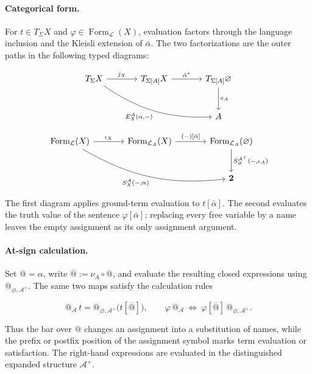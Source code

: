 \documentclass[11pt]{article}
\makeatletter
\newcommand{\atsign}{\mathord{@}}
\theoremstyle{definition}
\makeatother
\begin{document}
\paragraph{Categorical form.}
For \(t\in T_\Sigma X\) and
\(\varphi\in\operatorname{Form}_{\mathcal L}(X)\), evaluation factors through
the language inclusion and the Kleisli extension of \(\bar\alpha\). The two
factorizations are the outer paths in the following typed diagrams:

\[
\begin{tikzcd}[row sep=large,column sep=large]
T_\Sigma X
  \arrow[r,"j_X"]
  \arrow[drr,bend right=18,"{E_X^{\mathcal A}(\alpha,-)}"'] &
T_{\Sigma[A]}X \arrow[r,"\bar\alpha^*"] &
T_{\Sigma[A]}\varnothing \arrow[d,"e_A"] \\
&& A
\end{tikzcd}
\]

\[
\begin{tikzcd}[row sep=large,column sep=large]
\operatorname{Form}_{\mathcal L}(X)
  \arrow[r,"\iota_X"]
  \arrow[drr,bend right=18,"{S_X^{\mathcal A}(-,\alpha)}"'] &
\operatorname{Form}_{\mathcal L_A}(X)
  \arrow[r,"{(-)[\bar\alpha]}"] &
\operatorname{Form}_{\mathcal L_A}(\varnothing)
  \arrow[d,"{S_\varnothing^{\mathcal A^+}(-,\epsilon_A)}"] \\
&& \mathbf 2
\end{tikzcd}
\]

The first diagram applies ground-term evaluation to \(t[\bar\alpha]\). The
second evaluates the truth value of the sentence \(\varphi[\bar\alpha]\);
replacing every free variable by a name leaves the empty assignment as its only
assignment argument.

\paragraph{At-sign calculation.}
Set \(\atsign=\alpha\), write
\(\overline{\atsign}:=\nu_A\circ\atsign\), and evaluate the resulting
closed expressions using \(\atsign_{\varnothing,\mathcal A^+}\). The same two maps
satisfy the calculation rules

\[
\boxed{
\atsign_{\mathcal A}\,t
=\atsign_{\varnothing,\mathcal A^+}\bigl(t[\overline{\atsign}]\bigr),
\qquad
\varphi\,\atsign_{\mathcal A}
\ \Longleftrightarrow\ 
\varphi[\overline{\atsign}]\,\atsign_{\varnothing,\mathcal A^+}.
}
\]

Thus the bar over \(\atsign\) changes an assignment into a substitution of
names, while the prefix or postfix position of the assignment symbol marks
term evaluation or satisfaction. The right-hand expressions are evaluated in
the distinguished expanded structure \(\mathcal A^+\).
\end{document}

